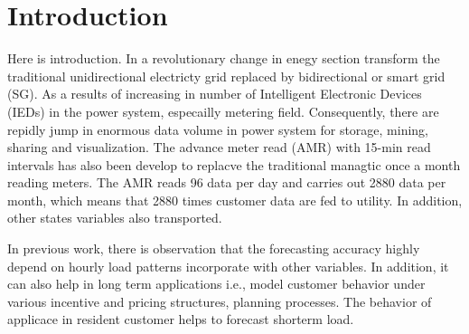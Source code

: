 \documentclass[conference]{IEEEtran}
\begin{document}
\section{Introduction}
Here is introduction.
In a revolutionary change in enegy section transform the traditional unidirectional electricty grid replaced by bidirectional or smart grid (SG).
As a results of increasing in number of Intelligent Electronic Devices (IEDs) in the power system, especailly metering field.
Consequently, there are repidly jump in enormous data volume in power system for storage, mining, sharing and visualization\cite{b1}.
The advance meter read (AMR) with 15-min read intervals has also been develop to replacve the traditional managtic once a month reading meters.
The AMR reads 96 data per day and carries out 2880 data per month, which means that 2880 times customer data are fed to utility.
In addition, other states variables also transported.


In previous work, there is observation that the forecasting accuracy highly depend on hourly load patterns incorporate with other variables\cite{b2}. In addition, it can also help in long term applications i.e., model customer behavior under various incentive and pricing structures, planning processes\cite{b4}. The behavior of applicace in resident customer helps to forecast shorterm load\cite{b6}.


%
%
\end{document}
